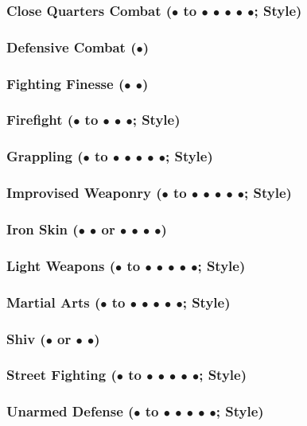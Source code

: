 \documentclass["../Misguided by Starlight.tex"]{subfiles}
\begin{document}
	\subsubsection{Close Quarters Combat ($\bullet$ to $\bullet$ $\bullet$ $\bullet$ $\bullet$ $\bullet$; Style)} %
	
	\subsubsection{Defensive Combat ($\bullet$)} %
	
	\subsubsection{Fighting Finesse ($\bullet$ $\bullet$)} %
	
	\subsubsection{Firefight ($\bullet$ to $\bullet$ $\bullet$ $\bullet$; Style)} %
	
	\subsubsection{Grappling ($\bullet$ to $\bullet$ $\bullet$ $\bullet$ $\bullet$ $\bullet$; Style)} %
	
	\subsubsection{Improvised Weaponry ($\bullet$ to $\bullet$ $\bullet$ $\bullet$ $\bullet$ $\bullet$; Style)} %
	
	\subsubsection{Iron Skin ($\bullet$ $\bullet$ or $\bullet$ $\bullet$ $\bullet$ $\bullet$)} %
	
	\subsubsection{Light Weapons ($\bullet$ to $\bullet$ $\bullet$ $\bullet$ $\bullet$ $\bullet$; Style)} %
	
	\subsubsection{Martial Arts ($\bullet$ to $\bullet$ $\bullet$ $\bullet$ $\bullet$ $\bullet$; Style)} %
	
	\subsubsection{Shiv ($\bullet$ or $\bullet$ $\bullet$)} %
	
	\subsubsection{Street Fighting ($\bullet$ to $\bullet$ $\bullet$ $\bullet$ $\bullet$ $\bullet$; Style)} %
	
	\subsubsection{Unarmed Defense ($\bullet$ to $\bullet$ $\bullet$ $\bullet$ $\bullet$ $\bullet$; Style)} %
\end{document}
